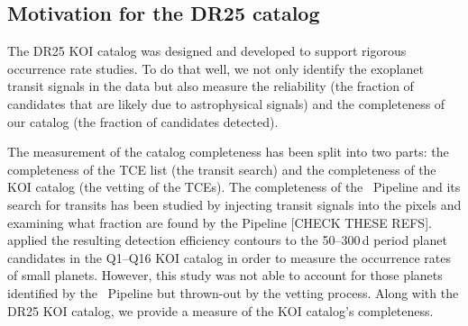 
\subsection{Motivation for the DR25 catalog}

The DR25 KOI catalog was designed and developed to support rigorous occurrence rate studies. To do that well, we not only identify the exoplanet transit signals in the data but also measure the reliability (the fraction of candidates that are likely due to astrophysical signals) and the completeness of our catalog (the fraction of candidates detected).

The measurement of the catalog completeness has been split into two parts: the completeness of the TCE list (the transit search) and the completeness of the KOI catalog (the vetting of the TCEs). The completeness of the \Kepler\ Pipeline and its search for transits has been studied by injecting transit signals into the pixels and examining what fraction are found by the Pipeline \citep{Christiansen2015b,Christiansen2013a}[CHECK THESE REFS]. \citet{Burke2015} applied the resulting detection efficiency contours to the 50--300\,d period planet candidates in the Q1--Q16 KOI catalog \citep{Mullally2015cat} in order to measure the occurrence rates of small planets. However, this study was not able to account for those planets identified by the \Kepler\ Pipeline but thrown-out by the vetting process. Along with the DR25 KOI catalog, we provide a measure of the KOI catalog's completeness.

